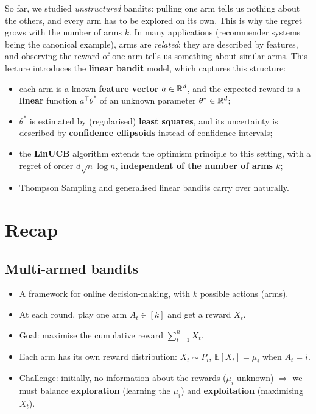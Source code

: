 

So far, we studied \emph{unstructured} bandits: pulling one arm tells us nothing about the others, and every arm has to be explored on its own. This is why the regret grows with the number of arms $k$. In many applications (recommender systems being the canonical example), arms are \emph{related}: they are described by features, and observing the reward of one arm tells us something about similar arms. This lecture introduces the \textbf{linear bandit} model, which captures this structure:
\begin{itemize}
    \item each arm is a known \textbf{feature vector} $a \in \mathbb{R}^d$, and the expected reward is a \textbf{linear} function $a^\top \theta^*$ of an unknown parameter $\theta^* \in \mathbb{R}^d$;
    \item $\theta^*$ is estimated by (regularised) \textbf{least squares}, and its uncertainty is described by \textbf{confidence ellipsoids} instead of confidence intervals;
    \item the \textbf{LinUCB} algorithm extends the optimism principle to this setting, with a regret of order $d\sqrt{n}\log n$, \textbf{independent of the number of arms $k$};
    \item Thompson Sampling and generalised linear bandits carry over naturally.
\end{itemize}

\section{Recap}

\subsection{Multi-armed bandits}

\begin{itemize}
    \item A framework for online decision-making, with $k$ possible actions (arms).
    \item At each round, play one arm $A_t \in [k]$ and get a reward $X_t$.
    \item Goal: maximise the cumulative reward $\sum_{t=1}^n X_t$.
    \item Each arm has its own reward distribution: $X_t \sim P_i$, $\mathbb{E}[X_t] = \mu_i$ when $A_t = i$.
    \item Challenge: initially, no information about the rewards ($\mu_i$ unknown) $\Rightarrow$ we must balance \textbf{exploration} (learning the $\mu_i$) and \textbf{exploitation} (maximising $X_t$).
\end{itemize}

